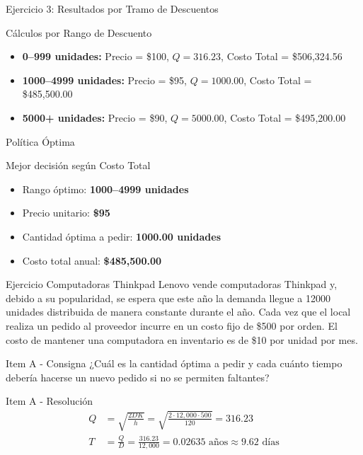 \documentclass{beamer}
\begin{document}
\begin{frame}{Ejercicio 3: Resultados por Tramo de Descuentos}
    \begin{block}{Cálculos por Rango de Descuento}
        \begin{itemize}
            \item \textbf{0--999 unidades:} Precio = \$100, \quad $Q = 316.23$, \quad Costo Total = \$506{,}324.56
            \item \textbf{1000--4999 unidades:} Precio = \$95, \quad $Q = 1000.00$, \quad Costo Total = \$485{,}500.00
            \item \textbf{5000+ unidades:} Precio = \$90, \quad $Q = 5000.00$, \quad Costo Total = \$495{,}200.00
        \end{itemize}
    \end{block}
\end{frame}

\begin{frame}{Política Óptima}
    \begin{block}{Mejor decisión según Costo Total}
        \begin{itemize}
            \item Rango óptimo: \textbf{1000--4999 unidades}
            \item Precio unitario: \textbf{\$95}
            \item Cantidad óptima a pedir: \textbf{1000.00 unidades}
            \item Costo total anual: \textbf{\$485{,}500.00}
        \end{itemize}
    \end{block}
\end{frame}

\begin{frame}{Ejercicio Computadoras Thinkpad}
    Lenovo vende computadoras Thinkpad y, debido a su popularidad, se espera que este año la demanda llegue a 12000 unidades distribuida de manera constante durante el año. Cada vez que el local realiza un pedido al proveedor incurre en un costo fijo de \$500 por orden. El costo de mantener una computadora en inventario es de \$10 por unidad por mes.
\end{frame}

\begin{frame}{Item A - Consigna}
    ¿Cuál es la cantidad óptima a pedir y cada cuánto tiempo debería hacerse un nuevo pedido si no se permiten faltantes?
\end{frame}

\begin{frame}{Item A - Resolución}
\begin{align*}
Q &= \sqrt{\frac{2DK}{h}} = \sqrt{\frac{2 \cdot 12{,}000 \cdot 500}{120}} = 316.23 \\[2em]
T &= \frac{Q}{D} = \frac{316.23}{12{,}000} = 0.02635 \text{ años} \approx 9.62 \text{ días}
\end{align*}
\end{frame}
\end{document}
